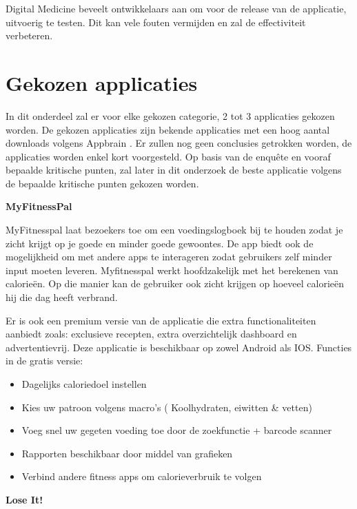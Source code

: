 Digital Medicine beveelt ontwikkelaars aan om voor de release van de applicatie, uitvoerig te testen. Dit kan vele fouten vermijden en zal de effectiviteit verbeteren.

\section{Gekozen applicaties}
\label{sec:gekozen-apps}

In dit onderdeel zal er voor elke gekozen categorie, 2 tot 3 applicaties gekozen worden. De gekozen applicaties zijn bekende applicaties met een hoog aantal downloads volgens Appbrain \autocite{Appbrain2018}. Er zullen nog geen conclusies getrokken worden, de applicaties worden enkel kort voorgesteld. Op basis van de enquête en vooraf bepaalde kritische punten, zal later in dit onderzoek de beste applicatie volgens de bepaalde kritische punten gekozen worden.

\textbf{MyFitnessPal}

MyFitnesspal laat bezoekers toe om een voedingslogboek bij te houden zodat je zicht krijgt op je goede en minder goede gewoontes. De app biedt ook de mogelijkheid om met andere apps te interageren zodat gebruikers zelf minder input moeten leveren. Myfitnesspal werkt hoofdzakelijk met het berekenen van calorieën. Op die manier kan de gebruiker ook zicht krijgen op hoeveel calorieën hij die dag heeft verbrand. 

Er is ook een premium versie van de applicatie die extra functionaliteiten aanbiedt zoals: exclusieve recepten, extra overzichtelijk dashboard en advertentievrij.
Deze applicatie is beschikbaar op zowel Android als IOS.
\newpage
Functies in de gratis versie:
\begin{itemize}

    \item Dagelijks caloriedoel instellen
    \item Kies uw patroon volgens macro’s ( Koolhydraten, eiwitten \& vetten)
    \item Voeg snel uw gegeten voeding toe door de zoekfunctie + barcode scanner
    \item Rapporten beschikbaar door middel van grafieken
    \item Verbind andere fitness apps om calorieverbruik te volgen
\end{itemize}

\textbf{Lose It!}



